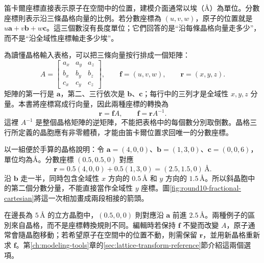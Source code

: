 笛卡爾座標直接表示原子在空間中的位置，建模介面通常以埃（\AA）為單位。分數座標則表示沿三條晶格向量的比例。若分數座標為 $(u,v,w)$，原子的位置就是 $u\mathbf a+v\mathbf b+w\mathbf c$。這三個數沒有長度單位；它們回答的是“沿每條晶格向量走多少”，而不是“沿全域性座標軸走多少埃”。

為讀懂晶格輸入表格，可以把三條向量按行排成一個矩陣：
\[
 A=\begin{bmatrix}
 a_x&a_y&a_z\\
 b_x&b_y&b_z\\
 c_x&c_y&c_z
 \end{bmatrix},\qquad
 \mathbf f=(u,v,w),\qquad \mathbf r=(x,y,z).
\]
矩陣的第一行是 $\mathbf a$，第二、三行依次是 $\mathbf b$、$\mathbf c$；每行中的三列才是全域性 $x,y,z$ 分量。本書將座標寫成行向量，因此兩種座標的轉換為
\begin{equation}
 \mathbf r=\mathbf f A,\qquad \mathbf f=\mathbf r A^{-1}.
 \label{eq:row-lattice-coordinates}
\end{equation}
這裡 $A^{-1}$ 是整個晶格矩陣的逆矩陣，不能把表格中的每個數分別取倒數。晶格三行所定義的晶胞應有非零體積，才能由笛卡爾位置求回唯一的分數座標。

以一組便於手算的晶格說明：令 $\mathbf a=(4,0,0)$、$\mathbf b=(1,3,0)$、$\mathbf c=(0,0,6)$，單位均為\AA。分數座標 $(0.5,0.5,0)$ 對應
\[
 \mathbf r=0.5(4,0,0)+0.5(1,3,0)
          =(2.5,1.5,0)\,\text{\AA}.
\]
沿 $\mathbf b$ 走一半，同時包含全域性 $x$ 方向的 $0.5\,\text{\AA}$ 和 $y$ 方向的 $1.5\,\text{\AA}$。所以斜晶胞中的第二個分數分量，不能直接當作全域性 $y$ 座標。圖\ref{fig:round10-fractional-cartesian}將這一次相加畫成兩段相接的箭頭。



在邊長為 $5\,\text{\AA}$ 的立方晶胞中，$(0.5,0,0)$ 則對應沿 $\mathbf a$ 前進 $2.5\,\text{\AA}$。兩種例子的區別來自晶格，而不是座標轉換規則不同。編輯時若保持 $\mathbf f$ 不變而改變 $A$，原子通常會隨晶胞移動；若希望原子在空間中的位置不動，則需保留 $\mathbf r$，並用新晶格重新求 $\mathbf f$。第\ref{ch:modeling-tools}章的\ref{sec:lattice-transform-reference}節介紹這兩個選項。

